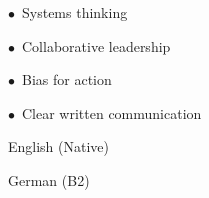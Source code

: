 \documentclass[10pt, a4paper]{article}
\begin{document}
\begin{minipage}[t]{0.33\textwidth}
{\begin{minipage}[t][\paperheight][t]{\linewidth}
\vspace{10pt}
\par
\vspace{4pt}
\hspace{6pt}
{\footnotesize
$\bullet$\ Systems thinking\par
\hspace{6pt}$\bullet$\ Collaborative leadership\par
\hspace{6pt}$\bullet$\ Bias for action\par
\hspace{6pt}$\bullet$\ Clear written communication\par
}

\vspace{10pt}
\par
\vspace{4pt}
\hspace{6pt}
{\footnotesize
English (Native)\par
\hspace{6pt}German (B2)\par
}

\end{minipage}}%
\end{minipage}%
\end{document}
